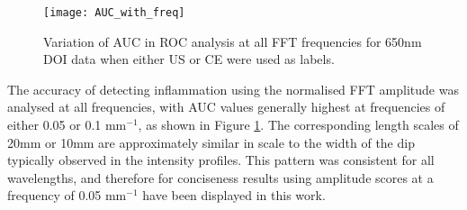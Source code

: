 \documentclass[twoside]{bhamthesis}
\theoremstyle{definition}
\begin{document}
\begin{comment}
\begin{table}[ht]
\caption{Median values and p-values for inflamed versus non-inflamed at a threshold of 0.135. For all wavelengths when either CE or US were used as class labels.} 
\label{tab:diagnostic accuracy}
\begin{center}       
\begin{tabular}{c c c c c} 
\hline
\rule[-1ex]{0pt}{3.5ex} \multirow{ 2}{*}{$\lambda$ (nm)} & \multicolumn{2}{c}{CE} & \multicolumn{2}{c}{US} \\
\rule[-1ex]{0pt}{3.5ex} & AUC &  p-value & AUC & p-value \\
\hline
\rule[-1ex]{0pt}{3.5ex}  650 & 0.801 & 0.00000166 & 0.888 & 0.00000000757 \\
\rule[-1ex]{0pt}{3.5ex}  710 & 0.780 & 0.00000844 & 0.877 & 0.0000000201\textcolor{white}{0} \\
\rule[-1ex]{0pt}{3.5ex}  730 & 0.787 & 0.00000493 & 0.880 & 0.0000000141\textcolor{white}{0}\\
\rule[-1ex]{0pt}{3.5ex}  830 & 0.767 & 0.0000189\textcolor{white}{0} & 0.877 & 0.0000000201\textcolor{white}{0}\\
\rule[-1ex]{0pt}{3.5ex}  930 & 0.769 & 0.0000181\textcolor{white}{0} & 0.859 &  0.0000000906\textcolor{white}{0}\\
\hline
\end{tabular}
\end{center}
\end{table}
\textcolor{black}{text}
\end{comment}

\begin{figure}[!ht]
\centering\texttt{[image: AUC\_with\_freq]}\caption{Variation of AUC in ROC analysis at all FFT frequencies for 650nm DOI data when either US or CE were used as labels.}
\label{fig:Freq_variation}
\end{figure}

The accuracy of detecting inflammation using the normalised FFT amplitude was analysed at all frequencies, with AUC values generally highest at frequencies of either 0.05 or 0.1 mm$^{-1}$, as shown in Figure \ref{fig:Freq_variation}. The corresponding length scales of 20mm or 10mm are approximately similar in scale to the width of the dip typically observed in the intensity profiles. This pattern was consistent for all wavelengths, and therefore for conciseness results using amplitude scores at a frequency of 0.05 mm$^{-1}$ have been displayed in this work.
\end{document}
